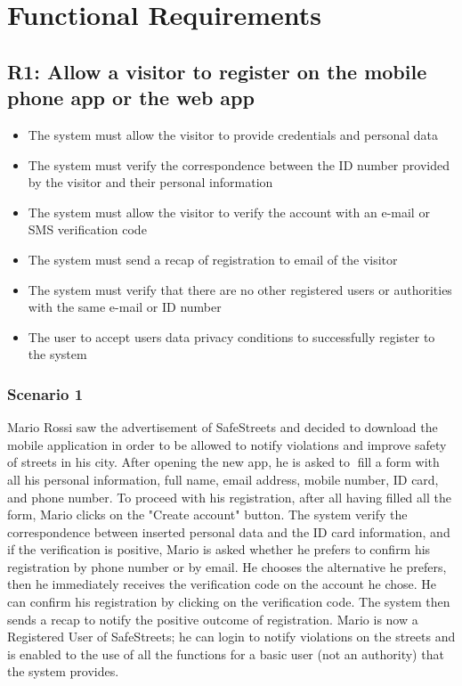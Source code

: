 \section{Functional Requirements}

\subsection{R1: Allow a visitor to register on the mobile phone app or the web app}
\begin{itemize}
    \item The system must allow the visitor to provide credentials and personal data
    \item The system must verify the correspondence between the ID number provided by the visitor and their personal information
    \item The system must allow the visitor to verify the account with an e-mail or SMS verification code
    \item The system must send a recap of registration to email of the visitor
    \item The system must verify that there are no other registered users or authorities with the same e-mail or ID number
    \item The user to accept users data privacy conditions to successfully register to the system
\end{itemize}
\subsubsection{Scenario 1}
Mario Rossi saw the advertisement of SafeStreets and decided to download the mobile application in order to be allowed to notify violations and improve safety of streets in his city. After
opening the new app, he is asked to fill a form with all his personal information, full name, email address, mobile number, ID card, and phone number. To proceed with his
registration, after all having filled all the form, Mario clicks on the "Create account" button. The system verify the correspondence between inserted personal data and the ID card information,
and if the verification is positive, Mario is asked whether he prefers to confirm his registration by phone number or by email.
He chooses the alternative he prefers, then he immediately receives the verification code on the account he chose.
He can confirm his registration by clicking on the verification code. The system then sends a recap to notify the positive outcome of registration. Mario is now a Registered
User of SafeStreets; he can login to notify violations on the streets and is enabled to the use of all the functions for a basic user (not an authority) that the system provides.

